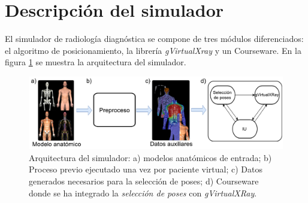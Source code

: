 


\section{Descripción del simulador} 
\label{xray:method}


El simulador de radiología diagnóstica se compone de tres módulos diferenciados: el algoritmo de posicionamiento, la librería \emph{gVirtualXray} y un \ac{Courseware}. En la figura \ref{fig:Posesummary} se muestra la arquitectura del simulador.

\begin{figure}[h]
\centering
\includegraphics[width=\linewidth]{IMG/ArquXRAY.pdf}

\caption{\label{fig:Posesummary} Arquitectura del simulador: a) modelos anatómicos de entrada; b) Proceso previo ejecutado una vez por paciente virtual; c) Datos generados necesarios para la selección de poses; d) \ac{Courseware} donde se ha integrado la \emph{selección de poses} con \emph{gVirtualXRay}.
}
\end{figure}

